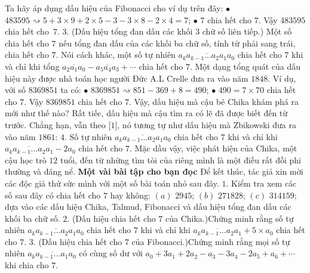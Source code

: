 \begin{multicols}{2}
	\vskip 0.1cm
	Ta hãy áp dụng dấu hiệu của Fibonacci cho ví dụ trên đây:
	\vskip 0.1cm	
	$\bullet$ $483595 \rightsquigarrow	5+ 3\times 9 + 2\times 5 -3 -3\times 8 - 2\times 4=7$;
	\vskip 0.1cm
	$\bullet$ $7$ chia hết cho $7$. Vậy $483595$ chia hết cho~$7$.
	\vskip 0.1cm
	$3.$ (Dấu hiệu tổng đan dấu các khối $3$ chữ số liên tiếp.) Một số chia hết cho $7$ nếu tổng đan dấu của các khối ba chữ số, tính từ phải sang trái, chia hết cho $7$. Nói cách khác, một số tự nhiên $\overline{a_ka_{k-1}\ldots a_2 a_1 a_0}$ chia hết cho $7$ khi và chỉ khi tổng $\overline{a_2a_1a_0}- \overline{a_5a_4a_3}+ \cdots$ chia hết cho $7$. Một dạng tổng quát của dấu hiệu này được nhà toán học người Đức A.L Crelle đưa ra vào năm $1848$.
	\vskip 0.1cm
	Ví dụ, với số $8369851$ ta có:
	\vskip 0.1cm	
	$\bullet$ $8369851 \rightsquigarrow 851-369 + 8 = 490$;
	\vskip 0.1cm
	$\bullet$ $490 = 7 \times 70$  chia hết cho $7$. Vậy $8369851$ chia hết cho $7$.
	\vskip 0.1cm
	Vậy, dấu hiệu mà cậu bé Chika khám phá ra mới như thế nào? Rất tiếc, dấu hiệu mà cậu tìm ra có lẽ đã được biết đến từ trước. Chẳng hạn, vẫn theo [$1$], nó tương tự như dấu hiệu mà Zbikowski đưa ra vào năm $1861$:
	\vskip 0.1cm
	$4.$ Số tự nhiên $\overline{a_k a_{k-1}\ldots a_2a_1a_0}$ chia hết cho $7$ khi và chỉ khi $\overline{a_k a_{k-1}\ldots a_2a_1} -2a_0$ chia hết cho $7$.
	\vskip 0.1cm
	Mặc dầu vậy, việc phát hiện của Chika, một cậu học trò $12$ tuổi, đến từ những tìm tòi của riêng mình là một điều rất đỗi phi thường và đáng nể.
	\vskip 0.1cm
	\textbf{\color{quantoan}Một vài bài tập cho bạn đọc}
	\vskip 0.1cm
	Để kết thúc, tác giả xin mời các độc giả thử sức mình với một số bài toán nhỏ sau đây.
	\vskip 0.1cm
	$1.$ Kiểm tra xem các số sau đây có chia hết cho $7$ hay không: 
	\vskip 0.1cm
	$(a)$ $2945$;
	\vskip 0.1cm
	$(b)$ $271828$;
	\vskip 0.1cm
	$(c)$ $314159$;
	\vskip 0.1cm
	dựa vào các dấu hiệu Chika, Talmud, \linebreak Fibonacci và dấu hiệu tổng đan dấu các khối ba chữ số.
	\vskip 0.1cm	
	$2.$ (Dấu hiệu chia hết cho $7$ của Chika.)\linebreak Chứng minh rằng số tự nhiên \linebreak $ \overline{a_k a_{k-1}\ldots a_2a_1a_0}$ chia hết cho $7$ khi và chỉ khi  $ \overline{a_k a_{k-1}\ldots a_2a_1} +5\times a_0$ chia hết cho $7$.
	\vskip 0.1cm	
	$3.$ (Dấu hiệu chia hết cho $7$ của Fibonacci.)\linebreak Chứng minh rằng mọi số tự nhiên $\overline{a_k a_{k-1}\ldots a_1a_0}$ có cùng số dư với $a_0+3a_1+ 2a_2 -a_3 -3a_4 -2a_5 + a_6 + \cdots$ khi chia \linebreak cho $7$.

\end{multicols}
